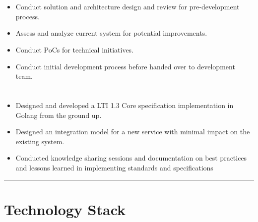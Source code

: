\documentclass[12pt]{res}
\begin{document}
\begin{resume}
\begin{multicols}{2}
	\section{}
		\begin{itemize}
			\item Conduct solution and architecture design and review for pre-development process.
\item Assess and analyze current system for potential improvements.
\item Conduct PoCs for technical initiatives.
\item Conduct initial development process before handed over to development team.
		\end{itemize}
	\section{}
		\begin{itemize}
			\setlength{\itemindent}{0pt}
			\item Designed and developed a LTI 1.3 Core specification implementation in Golang from the ground up.
\item Designed an integration model for a new service with minimal impact on the existing system.
\item Conducted knowledge sharing sessions and documentation on best practices and lessons learned in implementing standards and specifications
		\end{itemize}
\end{multicols}

\vspace{-20pt}
\begin{minipage}[t]{0.55\linewidth}
	\rule{0.25\textwidth}{2pt}
	\begin{multicols}{2}
		\section{Technology Stack}
		\columnbreak
		\section{}
	\end{multicols}
	\vspace{1pt}
\end{minipage}
\hfill
\begin{minipage}[t]{0.42\linewidth}
	\vspace{18pt}

\end{minipage}
\end{resume}
\end{document}
